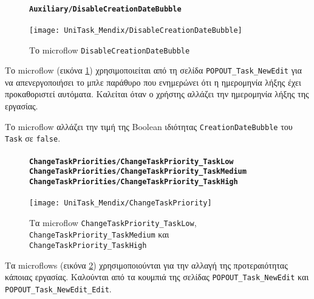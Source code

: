                 \begin{figure}[H] \noindent
                    \paragraph{\texttt{Auxiliary/DisableCreationDateBubble}}
                    \begin{center}
                        \texttt{[image: UniTask\_Mendix/DisableCreationDateBubble]}
                        \caption{\centering Το microflow \texttt{DisableCreationDateBubble}}
                        \label{fig:unitask_DisableCreationDateBubble}
                    \end{center}
                \end{figure}

                Το microflow (εικόνα \ref{fig:unitask_DisableCreationDateBubble}) χρησιμοποιείται από τη σελίδα \texttt{POPOUT\_Task\_NewEdit} για να απενεργοποιήσει το μπλε παράθυρο που ενημερώνει ότι η ημερομηνία λήξης έχει προκαθοριστεί αυτόματα. Καλείται όταν ο χρήστης αλλάζει την ημερομηνία λήξης της εργασίας.

                Το microflow αλλάζει την τιμή της Boolean ιδιότητας \texttt{CreationDateBubble} του \texttt{Task} σε \texttt{false}.

                \begin{figure}[H] \noindent
                    \paragraph{\texttt{ChangeTaskPriorities/ChangeTaskPriority\_TaskLow} \\ \texttt{ChangeTaskPriorities/ChangeTaskPriority\_TaskMedium} \\ \texttt{ChangeTaskPriorities/ChangeTaskPriority\_TaskHigh}}
                    \begin{center}
                        \texttt{[image: UniTask\_Mendix/ChangeTaskPriority]}
                        \caption{\centering Τα microflow \texttt{ChangeTaskPriority\_TaskLow}, \texttt{ChangeTaskPriority\_TaskMedium} και \texttt{ChangeTaskPriority\_TaskHigh}}
                        \label{fig:unitask_ChangeTaskPriority}
                    \end{center}
                \end{figure}

                Τα microflows (εικόνα \ref{fig:unitask_ChangeTaskPriority}) χρησιμοποιούνται για την αλλαγή της προτεραιότητας κάποιας εργασίας. Καλούνται από τα κουμπιά της σελίδας \texttt{POPOUT\_Task\_NewEdit} και \texttt{POPOUT\_Task\_NewEdit\_Edit}.

